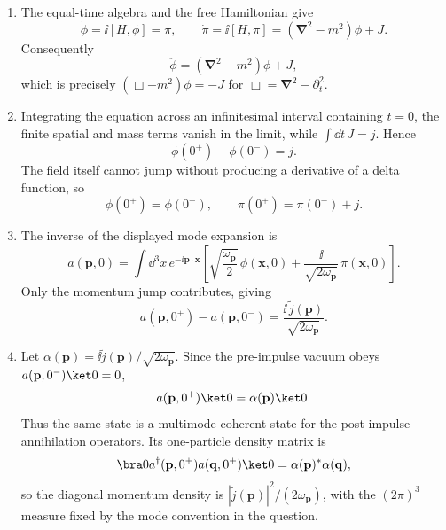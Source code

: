 \begin{enumerate}
\begin{enumerate}
\item
The equal-time algebra and the free Hamiltonian give
\[
 \dot\phi=\ii[H,\phi]=\pi,\qquad
 \dot\pi=\ii[H,\pi]=(\boldsymbol\nabla^2-m^2)\phi+J.
\]
Consequently
\[
 \ddot\phi=(\boldsymbol\nabla^2-m^2)\phi+J,
\]
which is precisely
\((\Box-m^2)\phi=-J\) for
\(\Box=\boldsymbol\nabla^2-\partial_t^2\).
\item
Integrating the equation across an infinitesimal interval containing
\(t=0\), the finite spatial and mass terms vanish in the limit, while
\(\int \dd t\,J=j\).  Hence
\[
 \dot\phi(0^+)-\dot\phi(0^-)=j.
\]
The field itself cannot jump without producing a derivative of a delta
function, so
\[
 \phi(0^+)=\phi(0^-),\qquad
 \pi(0^+)=\pi(0^-)+j.
\]
\item
The inverse of the displayed mode expansion is
\[
 a(\mathbf p,0)=\int \dd^3x\,e^{-\ii\mathbf p\cdot\mathbf x}
 \left[
 \sqrt{\frac{\omega_{\mathbf p}}2}\,\phi(\mathbf x,0)
 +\frac{\ii}{\sqrt{2\omega_{\mathbf p}}}\,\pi(\mathbf x,0)
 \right].
\]
Only the momentum jump contributes, giving
\[
 a(\mathbf p,0^+)-a(\mathbf p,0^-)
 =\frac{\ii\,\widetilde j(\mathbf p)}{\sqrt{2\omega_{\mathbf p}}}.
\]
\item
Let
\(\alpha(\mathbf p)=\ii\widetilde j(\mathbf p)/
\sqrt{2\omega_{\mathbf p}}\).  Since the pre-impulse vacuum obeys
\(a(\mathbf p,0^-)\ket0=0\),
\[
 a(\mathbf p,0^+)\ket0=\alpha(\mathbf p)\ket0.
\]
Thus the same state is a multimode coherent state for the post-impulse
annihilation operators.  Its one-particle density matrix is
\[
 \bra0a^\dagger(\mathbf p,0^+)a(\mathbf q,0^+)\ket0
 =\alpha(\mathbf p)^*\alpha(\mathbf q),
\]
so the diagonal momentum density is
\(|\widetilde j(\mathbf p)|^2/(2\omega_{\mathbf p})\), with the
\((2\pi)^3\) measure fixed by the mode convention in the question.
\end{enumerate}


\end{enumerate}

